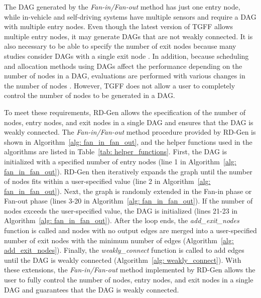 The DAG generated by the {\it Fan-in/Fan-out} method has just one entry node, while in-vehicle and self-driving systems have multiple sensors \cite{verucchi2020latency,guanindustry} and require a DAG with multiple entry nodes.
Even though the latest version of TGFF allows multiple entry nodes, it may generate DAGs that are not weakly connected.
It is also necessary to be able to specify the number of exit nodes because many studies consider DAGs with a single exit node \cite{cho2021conditionally, zhang2020efficient}.
In addition, because scheduling and allocation methods using DAGs affect the performance depending on the number of nodes in a DAG, evaluations are performed with various changes in the number of nodes \cite{senapati2021hmds, tong2020ql}.
However, TGFF does not allow a user to completely control the number of nodes to be generated in a DAG.

To meet these requirements, RD-Gen allows the specification of the number of nodes, entry nodes, and exit nodes in a single DAG and ensures that the DAG is weakly connected.
The {\it Fan-in/Fan-out} method procedure provided by RD-Gen is shown in Algorithm~\ref{alg: fan_in_fan_out}, and the helper functions used in the algorithms are listed in Table~\ref{tab: helper_functions}.
First, the DAG is initialized with a specified number of entry nodes (line 1 in Algorithm~\ref{alg: fan_in_fan_out}).
RD-Gen then iteratively expands the graph until the number of nodes fits within a user-specified value (line 2 in Algorithm~\ref{alg: fan_in_fan_out}).
Next, the graph is randomly extended in the Fan-in phase or Fan-out phase (lines 3-20 in Algorithm~\ref{alg: fan_in_fan_out}).
If the number of nodes exceeds the user-specified value, the DAG is initialized (lines 21-23 in Algorithm~\ref{alg: fan_in_fan_out}).
After the loop ends, the {\it add\_exit\_nodes} function is called and nodes with no output edges are merged into a user-specified number of exit nodes with the minimum number of edges (Algorithm~\ref{alg: add_exit_nodes}).
Finally, the {\it weakly\_connect} function is called to add edges until the DAG is weakly connected (Algorithm~\ref{alg: weakly_connect}).
With these extensions, the {\it Fan-in/Fan-out} method implemented by RD-Gen allows the user to fully control the number of nodes, entry nodes, and exit nodes in a single DAG and guarantees that the DAG is weakly connected.


